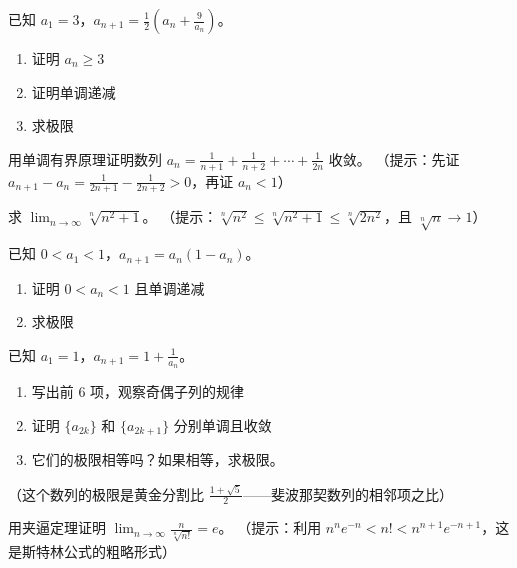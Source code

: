 \begin{exercise}[5]
已知 \(a_1 = 3\)，\(a_{n+1} = \frac{1}{2}\left(a_n + \frac{9}{a_n}\right)\)。
\begin{enumerate}
  \item[(1)] 证明 \(a_n \ge 3\)
  \item[(2)] 证明单调递减
  \item[(3)] 求极限
\end{enumerate}
\end{exercise}

\begin{exercise}[5]
用单调有界原理证明数列 \(a_n = \frac{1}{n+1} + \frac{1}{n+2} + \cdots + \frac{1}{2n}\) 收敛。
（提示：先证 \(a_{n+1} - a_n = \frac{1}{2n+1} - \frac{1}{2n+2} > 0\)，再证 \(a_n < 1\)）
\end{exercise}

\begin{exercise}[5]
求 \(\displaystyle \lim_{n\to\infty} \sqrt[n]{n^2 + 1}\)。
（提示：\(\sqrt[n]{n^2} \le \sqrt[n]{n^2+1} \le \sqrt[n]{2n^2}\)，且 \(\sqrt[n]{n} \to 1\)）
\end{exercise}

\begin{exercise}[5]
已知 \(0 < a_1 < 1\)，\(a_{n+1} = a_n(1 - a_n)\)。
\begin{enumerate}
  \item[(1)] 证明 \(0 < a_n < 1\) 且单调递减
  \item[(2)] 求极限
\end{enumerate}
\end{exercise}


\begin{exercise}[6]
已知 \(a_1 = 1\)，\(a_{n+1} = 1 + \frac{1}{a_n}\)。
\begin{enumerate}
  \item[(1)] 写出前 6 项，观察奇偶子列的规律
  \item[(2)] 证明 \(\{a_{2k}\}\) 和 \(\{a_{2k+1}\}\) 分别单调且收敛
  \item[(3)] 它们的极限相等吗？如果相等，求极限。
\end{enumerate}
（这个数列的极限是黄金分割比 \(\frac{1+\sqrt{5}}{2}\)——斐波那契数列的相邻项之比）
\end{exercise}

\begin{exercise}[6]
用夹逼定理证明 \(\displaystyle \lim_{n\to\infty} \frac{n}{\sqrt[n]{n!}} = e\)。
（提示：利用 \(n^n e^{-n} < n! < n^{n+1} e^{-n+1}\)，这是斯特林公式的粗略形式）
\end{exercise}

